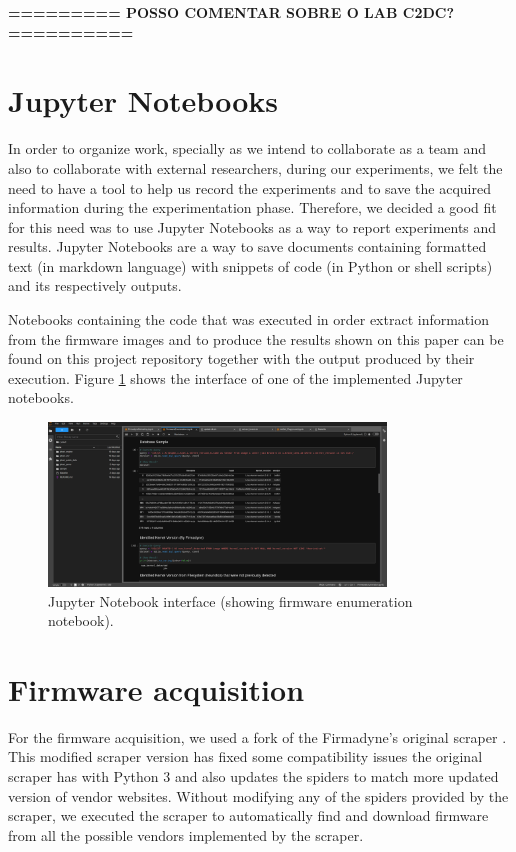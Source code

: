 \textbf{========= POSSO COMENTAR SOBRE O LAB C2DC? ========== }

\section{Jupyter Notebooks}

In order to organize work, specially as we intend to collaborate as a team and also to collaborate with external researchers, during our experiments, we felt the need to have a tool to help us record the experiments and to save the acquired information during the experimentation phase. Therefore, we decided a good fit for this need was to use Jupyter Notebooks as a way to report experiments and results. Jupyter Notebooks are a way to save documents containing formatted text (in markdown language) with snippets of code (in Python or shell scripts) and its respectively outputs.

Notebooks containing the code that was executed in order extract information from the firmware images and to produce the results shown on this paper can be found on this project repository \cite{github:c2dc-toso} together with the output produced by their execution. Figure \ref{fig:jupyter} shows the interface of one of the implemented Jupyter notebooks.

\begin{figure}[h]
    \centering
    \includegraphics[width=0.80\textwidth]{figs/jupyter.png}
    \caption{Jupyter Notebook interface (showing firmware enumeration notebook).}
    \label{fig:jupyter}
\end{figure}

\section{Firmware acquisition}

For the firmware acquisition, we used a fork of the Firmadyne's \cite{firmadyne} original scraper \cite{github:scraper}. This modified scraper version has fixed some compatibility issues the original scraper has with Python 3 and also updates the spiders to match more updated version of vendor websites. Without modifying any of the spiders provided by the scraper, we executed the scraper to automatically find and download firmware from all the possible vendors implemented by the scraper.

